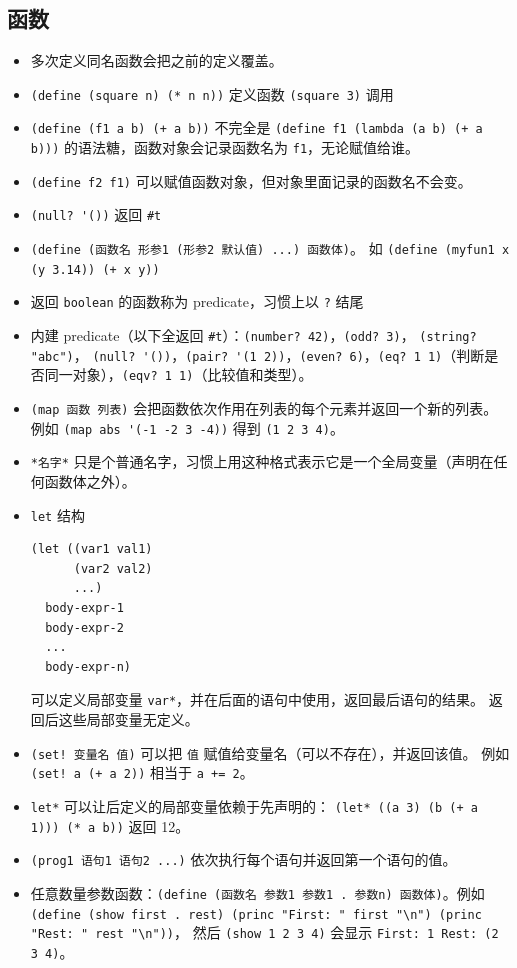 \subsection{函数}
\begin{itemize}
\item 多次定义同名函数会把之前的定义覆盖。
\item \verb`(define (square n) (* n n))` 定义函数 \verb`(square 3)` 调用
\item \verb`(define (f1 a b) (+ a b))` 不完全是 \verb`(define f1 (lambda (a b) (+ a b)))` 的语法糖，函数对象会记录函数名为 \verb`f1`，无论赋值给谁。
\item \verb`(define f2 f1)` 可以赋值函数对象，但对象里面记录的函数名不会变。
\item \verb`(null? '())` 返回 \verb`#t`
\item \verb`(define (函数名 形参1 (形参2 默认值) ...) 函数体)`。 如 \verb`(define (myfun1 x (y 3.14)) (+ x y))`
\item 返回 \verb`boolean` 的函数称为 predicate，习惯上以 \verb`?` 结尾
\item 内建 predicate（以下全返回 \verb`#t`）：\verb`(number? 42)`，\verb`(odd? 3)`， \verb`(string? "abc")`， \verb`(null? '())`，\verb`(pair? '(1 2))`，\verb`(even? 6)`，\verb`(eq? 1 1)`（判断是否同一对象），\verb`(eqv? 1 1)`（比较值和类型）。
\item \verb`(map 函数 列表)` 会把函数依次作用在列表的每个元素并返回一个新的列表。 例如 \verb`(map abs '(-1 -2 3 -4))` 得到 \verb`(1 2 3 4)`。
\item \verb`*名字*` 只是个普通名字，习惯上用这种格式表示它是一个全局变量（声明在任何函数体之外）。
\item \verb`let` 结构
\begin{lstlisting}[language=none]
(let ((var1 val1)
      (var2 val2)
      ...)
  body-expr-1
  body-expr-2
  ...
  body-expr-n)
\end{lstlisting}
可以定义局部变量 \verb`var*`，并在后面的语句中使用，返回最后语句的结果。 返回后这些局部变量无定义。
\item \verb`(set! 变量名 值)` 可以把 \verb`值` 赋值给变量名（可以不存在），并返回该值。 例如 \verb`(set! a (+ a 2))` 相当于 \verb`a += 2`。
\item \verb`let*` 可以让后定义的局部变量依赖于先声明的： \verb`(let* ((a 3) (b (+ a 1))) (* a b))` 返回 12。
\item \verb`(prog1 语句1 语句2 ...)` 依次执行每个语句并返回第一个语句的值。
\item 任意数量参数函数：\verb`(define (函数名 参数1 参数1 . 参数n) 函数体)`。例如 \verb`(define (show first . rest) (princ "First: " first "\n") (princ "Rest: " rest "\n"))`， 然后 \verb`(show 1 2 3 4)` 会显示 \verb`First: 1 Rest: (2 3 4)`。

\end{itemize}
